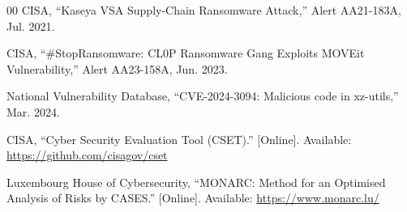 \documentclass[conference]{IEEEtran}
\begin{document}
\begin{thebibliography}{00}
CISA, ``Kaseya VSA Supply-Chain Ransomware Attack,'' Alert AA21-183A, Jul. 2021.

CISA, ``\#StopRansomware: CL0P Ransomware Gang Exploits MOVEit Vulnerability,''
Alert AA23-158A, Jun. 2023.

National Vulnerability Database, ``CVE-2024-3094: Malicious code in xz-utils,''
Mar. 2024.

CISA, ``Cyber Security Evaluation Tool (CSET).'' [Online]. Available:
\url{https://github.com/cisagov/cset}

Luxembourg House of Cybersecurity, ``MONARC: Method for an Optimised Analysis of
Risks by CASES.'' [Online]. Available: \url{https://www.monarc.lu/}

\end{thebibliography}
\end{document}
